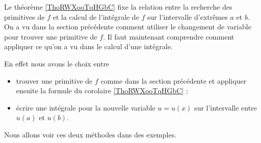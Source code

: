 Le théorème \ref{ThoRWXooTqHGbC} fixe la relation entre la recherche des primitives de \( f \) et la calcul de l'intégrale de \( f\) sur l'intervalle d'extrêmes \( a\) et \( b\). On a vu dans la section précédente comment utiliser le changement de variable pour trouver une primitive de \( f\). Il faut maintenant comprendre comment appliquer ce qu'on a vu dans le calcul d'une intégrale.

En effet nous avons le choix entre
\begin{itemize}
	\item trouver une primitive de \( f\) comme dans la section précédente et appliquer ensuite la formule du corolaire \ref{ThoRWXooTqHGbC} ;
	\item écrire une intégrale pour la nouvelle variable \( u = u(x)\) sur l'intervalle entre \( u(a)\) et \( u(b)\).
\end{itemize}

Nous allons voir ces deux méthodes dans des exemples.

